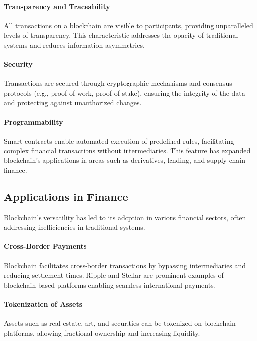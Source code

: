 \paragraph{Transparency and Traceability}
All transactions on a blockchain are visible to participants, providing unparalleled levels of transparency. This characteristic addresses the opacity of traditional systems and reduces information asymmetries. \cite{nakamoto_bitcoin_2008}

\paragraph{Security}
Transactions are secured through cryptographic mechanisms and consensus protocols (e.g., proof-of-work, proof-of-stake), ensuring the integrity of the data and protecting against unauthorized changes. \cite{iyengar_economics_2023}

\paragraph{Programmability}
Smart contracts enable automated execution of predefined rules, facilitating complex financial transactions without intermediaries. This feature has expanded blockchain's applications in areas such as derivatives, lending, and supply chain finance. \cite{morhaim_blockchain_2019} \\ 


\subsection{Applications in Finance}
Blockchain's versatility has led to its adoption in various financial sectors, often addressing inefficiencies in traditional systems.

\paragraph{Cross-Border Payments}
Blockchain facilitates cross-border transactions by bypassing intermediaries and reducing settlement times. Ripple and Stellar are prominent examples of blockchain-based platforms enabling seamless international payments.

\paragraph{Tokenization of Assets}
Assets such as real estate, art, and securities can be tokenized on blockchain platforms, allowing fractional ownership and increasing liquidity. 

